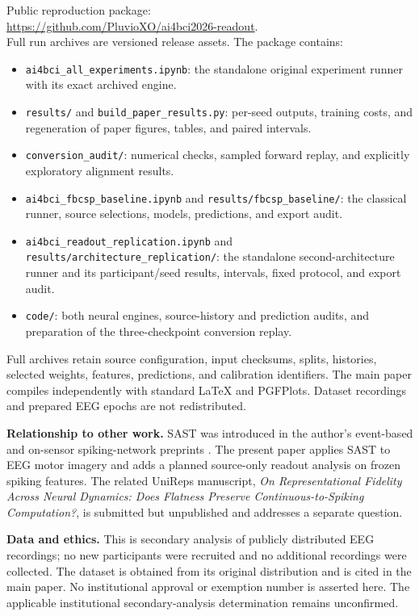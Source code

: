 \documentclass[11pt,a4paper]{article}
\begin{document}
Public reproduction package:\\
\url{https://github.com/PluvioXO/ai4bci2026-readout}.\\
Full run archives are versioned release assets. The package contains:
\begin{itemize}
\item \texttt{ai4bci\_all\_experiments.ipynb}: the standalone original experiment
runner with its exact archived engine.
\item \texttt{results/} and \texttt{build\_paper\_results.py}: per-seed outputs,
training costs, and regeneration of paper figures, tables, and paired intervals.
\item \texttt{conversion\_audit/}: numerical checks, sampled forward replay,
and explicitly exploratory alignment results.
\item \texttt{ai4bci\_fbcsp\_baseline.ipynb} and \texttt{results/fbcsp\_baseline/}:
the classical runner, source selections, models, predictions, and export audit.
\item \texttt{ai4bci\_readout\_replication.ipynb} and
\texttt{results/architecture\_replication/}: the standalone second-architecture
runner and its participant/seed results, intervals, fixed protocol, and export audit.
\item \texttt{code/}: both neural engines, source-history and prediction audits,
and preparation of the three-checkpoint conversion replay.
\end{itemize}
Full archives retain source configuration, input checksums, splits, histories,
selected weights, features, predictions, and calibration identifiers. The main
paper compiles independently with standard LaTeX and PGFPlots. Dataset recordings
and prepared EEG epochs are not redistributed.

\textbf{Relationship to other work.} SAST was introduced in the author's
event-based and on-sensor spiking-network preprints \citep{nicholson,nicholsonOnSensor}. The present paper applies SAST to EEG motor imagery and
adds a planned source-only readout analysis on frozen spiking features. The
related UniReps manuscript, \emph{On Representational Fidelity Across Neural
Dynamics: Does Flatness Preserve Continuous-to-Spiking Computation?}, is
submitted but unpublished and addresses a separate question.

\textbf{Data and ethics.} This is secondary analysis of publicly distributed
EEG recordings; no new participants were recruited and no additional
recordings were collected. The dataset is obtained from its original
distribution and is cited in the main paper. No institutional approval or
exemption number is asserted here. The applicable institutional secondary-analysis
determination remains unconfirmed.
\end{document}
